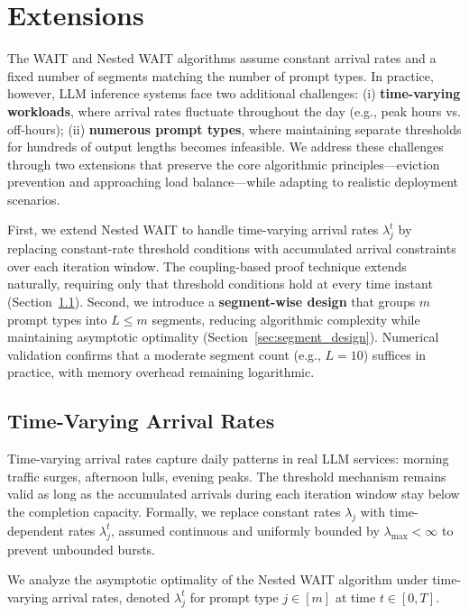 \section{Extensions}\label{sec:extension}

The WAIT and Nested WAIT algorithms assume constant arrival rates and a fixed number of segments matching the number of prompt types. In practice, however, LLM inference systems face two additional challenges: (i) \textbf{time-varying workloads}, where arrival rates fluctuate throughout the day (e.g., peak hours vs. off-hours); (ii) \textbf{numerous prompt types}, where maintaining separate thresholds for hundreds of output lengths becomes infeasible. We address these challenges through two extensions that preserve the core algorithmic principles—eviction prevention and approaching load balance—while adapting to realistic deployment scenarios.

First, we extend Nested WAIT to handle time-varying arrival rates $\lambda_j^t$ by replacing constant-rate threshold conditions with accumulated arrival constraints over each iteration window. The coupling-based proof technique extends naturally, requiring only that threshold conditions hold at every time instant (Section~\ref{sec:time_varying}). Second, we introduce a \textbf{segment-wise design} that groups $m$ prompt types into $L \leq m$ segments, reducing algorithmic complexity while maintaining asymptotic optimality (Section~\ref{sec:segment_design}). Numerical validation confirms that a moderate segment count (e.g., $L=10$) suffices in practice, with memory overhead remaining logarithmic.

\subsection{Time-Varying Arrival Rates}\label{sec:time_varying}

Time-varying arrival rates capture daily patterns in real LLM services: morning traffic surges, afternoon lulls, evening peaks. The threshold mechanism remains valid as long as the accumulated arrivals during each iteration window stay below the completion capacity. Formally, we replace constant rates $\lambda_j$ with time-dependent rates $\lambda_j^t$, assumed continuous and uniformly bounded by $\lambda_{\max} < \infty$ to prevent unbounded bursts.

We analyze the asymptotic optimality of the Nested WAIT algorithm under time-varying arrival rates, denoted $\lambda_j^t$ for prompt type $j \in [m]$ at time $t \in [0, T]$.


